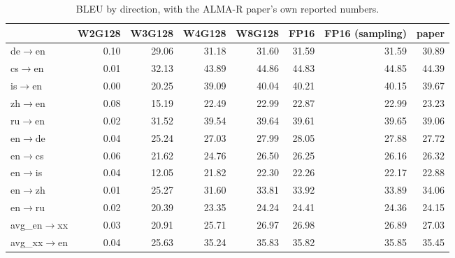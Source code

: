 \begin{table}[t]
\centering
\small
\begin{tabular}{lrrrrrrr}
\toprule
& W2G128 & W3G128 & W4G128 & W8G128 & FP16 & FP16 (sampling) & paper \\
\midrule
de$\rightarrow$en & 0.10 & 29.06 & 31.18 & 31.60 & 31.59 & 31.59 & 30.89 \\
cs$\rightarrow$en & 0.01 & 32.13 & 43.89 & 44.86 & 44.83 & 44.85 & 44.39 \\
is$\rightarrow$en & 0.00 & 20.25 & 39.09 & 40.04 & 40.21 & 40.15 & 39.67 \\
zh$\rightarrow$en & 0.08 & 15.19 & 22.49 & 22.99 & 22.87 & 22.99 & 23.23 \\
ru$\rightarrow$en & 0.02 & 31.52 & 39.54 & 39.64 & 39.61 & 39.65 & 39.06 \\
en$\rightarrow$de & 0.04 & 25.24 & 27.03 & 27.99 & 28.05 & 27.88 & 27.72 \\
en$\rightarrow$cs & 0.06 & 21.62 & 24.76 & 26.50 & 26.25 & 26.16 & 26.32 \\
en$\rightarrow$is & 0.04 & 12.05 & 21.82 & 22.30 & 22.26 & 22.17 & 22.88 \\
en$\rightarrow$zh & 0.01 & 25.27 & 31.60 & 33.81 & 33.92 & 33.89 & 34.06 \\
en$\rightarrow$ru & 0.02 & 20.39 & 23.35 & 24.24 & 24.41 & 24.36 & 24.15 \\
\midrule
avg\_en$\rightarrow$xx & 0.03 & 20.91 & 25.71 & 26.97 & 26.98 & 26.89 & 27.03 \\
avg\_xx$\rightarrow$en & 0.04 & 25.63 & 35.24 & 35.83 & 35.82 & 35.85 & 35.45 \\
\bottomrule
\end{tabular}
\caption{BLEU by direction, with the ALMA-R paper's own reported numbers.}
\label{tab:bleu}
\end{table}

